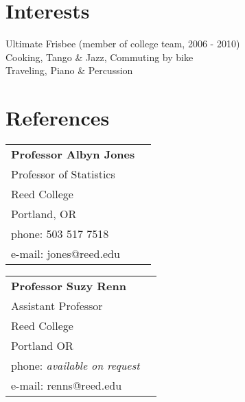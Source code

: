 \documentclass[margin,line]{resume}
\begin{document}
\begin{resume}
    \section{\mysidestyle Interests} 

Ultimate Frisbee (member of college team, 2006 - 2010) \\
Cooking, Tango \& Jazz, Commuting by bike \\
Traveling, Piano \& Percussion \\






\newpage
\section{\mysidestyle References} 

\begin{tabular}{@{}p{6cm}p{6cm}}
\textbf{Professor Albyn Jones}       \\
Professor of Statistics                              \\
Reed College                     \\
Portland, OR           \\
phone: 503 517 7518    \\
e-mail: jones@reed.edu  \\
\end{tabular}

\begin{tabular}{@{}p{6cm}p{6cm}}
 \textbf{Professor Suzy Renn}                   \\
 Assistant Professor                       \\
  Reed College                 \\
Portland OR        \\
phone: \textsl{available on request}     \\
 e-mail: renns@reed.edu    \\
\end{tabular}



\end{resume}
\end{document}
